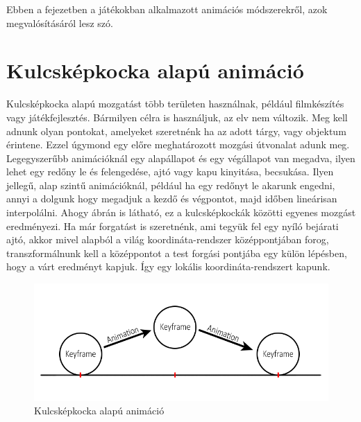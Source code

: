\label{Chap:animacio}

%
%
%

Ebben a fejezetben a játékokban alkalmazott animációs módszerekről, azok megvalósításáról lesz szó.


\section{Kulcsképkocka alapú animáció}

Kulcsképkocka alapú mozgatást több területen használnak, például filmkészítés vagy játékfejlesztés. Bármilyen célra is használjuk, az elv nem változik. Meg kell adnunk olyan pontokat, amelyeket szeretnénk ha az adott tárgy, vagy objektum érintene. Ezzel úgymond egy előre meghatározott mozgási útvonalat adunk meg. Legegyszerűbb animációknál egy alapállapot és egy végállapot van megadva, ilyen lehet egy redőny le és felengedése, ajtó vagy kapu kinyitása, becsukása. Ilyen jellegű, alap szintű animációknál, például ha egy redőnyt le akarunk engedni, annyi a dolgunk hogy megadjuk a kezdő és végpontot, majd időben lineárisan interpolálni. Ahogy  ábrán is látható, ez a kulcsképkockák közötti egyenes mozgást eredményezi. Ha már forgatást is szeretnénk, ami tegyük fel egy nyíló bejárati ajtó, akkor mivel alapból a világ koordináta-rendszer középpontjában forog, transzformálnunk kell a középpontot a test forgási pontjába egy külön lépésben, hogy a várt eredményt kapjuk. Így egy lokális koordináta-rendszert kapunk.

\begin{figure}[h]
\centering
\includegraphics[scale=0.5]{kepek/keyframe_anim.png}
\caption{Kulcsképkocka alapú animáció}
\label{fig:keyframe}
\end{figure}

